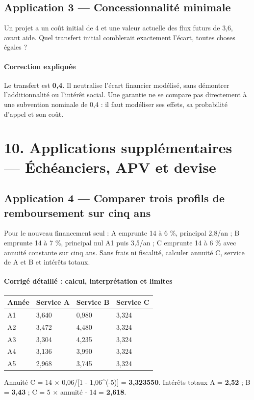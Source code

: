\documentclass[12pt,a4paper]{article}
\begin{document}
\subsection*{Application 3 --- Concessionnalité minimale}
Un projet a un coût initial de 4 et une valeur actuelle des flux futurs de 3,6, avant aide. Quel transfert initial comblerait exactement l’écart, toutes choses égales ?


\paragraph{Correction expliquée}
Le transfert est \textbf{0,4}. Il neutralise l’écart financier modélisé, sans démontrer l’additionnalité ou l’intérêt social. Une garantie ne se compare pas directement à une subvention nominale de 0,4 : il faut modéliser ses effets, sa probabilité d’appel et son coût.

\section*{10. Applications supplémentaires --- Échéanciers, APV et devise}

\subsection*{Application 4 --- Comparer trois profils de remboursement sur cinq ans}
Pour le nouveau financement seul : A emprunte 14 à 6 \%, principal 2,8/an ; B emprunte 14 à 7 \%, principal nul A1 puis 3,5/an ; C emprunte 14 à 6 \% avec annuité constante sur cinq ans. Sans frais ni fiscalité, calculer annuité C, service de A et B et intérêts totaux.


\paragraph{Corrigé détaillé : calcul, interprétation et limites}

\Needspace{250pt}
\begin{longtable}{p{3.67cm}p{3.67cm}p{3.67cm}p{3.67cm}}
\toprule
Année & Service A & Service B & Service C \\
\midrule\endhead
A1 & 3,640 & 0,980 & 3,324 \\
A2 & 3,472 & 4,480 & 3,324 \\
A3 & 3,304 & 4,235 & 3,324 \\
A4 & 3,136 & 3,990 & 3,324 \\
A5 & 2,968 & 3,745 & 3,324 \\
\bottomrule
\end{longtable}
Annuité C = 14 $\times$ 0,06/[1 - 1,06\textasciicircum{}(-5)] = \textbf{3,323550}. Intérêts totaux A = \textbf{2,52} ; B = \textbf{3,43} ; C = 5 $\times$ annuité - 14 = \textbf{2,618}.
\end{document}
